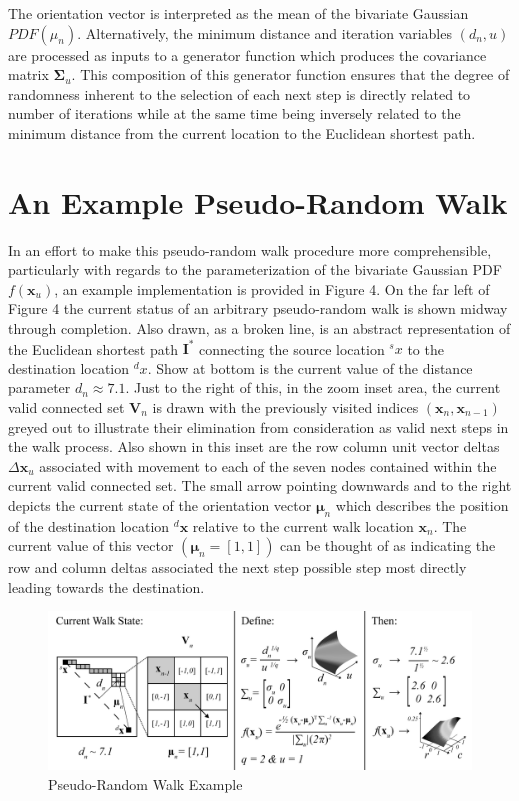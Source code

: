 The orientation vector is interpreted as the mean of the bivariate Gaussian $PDF(\mu_n)$. Alternatively, the minimum distance and iteration variables $(d_n ,u)$ are processed as inputs to a generator function which produces the covariance matrix $\boldsymbol{\Sigma}_u$. This composition of this generator function ensures that the degree of randomness inherent to the selection of each next step is directly related to number of iterations while at the same time being inversely related to the minimum distance from the current location to the Euclidean shortest path.
            
\section{An Example Pseudo-Random Walk}

In an effort to make this pseudo-random walk procedure more comprehensible, particularly with regards to the parameterization of the bivariate Gaussian PDF $f(\textbf{x}_u)$, an example implementation is provided in Figure 4. On the far left of Figure 4 the current status of an arbitrary pseudo-random walk is shown midway through completion. Also drawn, as a broken line, is an abstract representation of the Euclidean shortest path $\textbf{I}^*$ connecting the source location ${}^{s}x$ to the destination location ${}^{d}x$. Show at bottom is the current value of the distance parameter $d_n \approx 7.1$. Just to the right of this, in the zoom inset area, the current valid connected set $\textbf{V}_n$ is drawn with the previously visited indices $(\textbf{x}_n ,\textbf{x}_{n-1})$ greyed out to illustrate their elimination from consideration as valid next steps in the walk process. Also shown in this inset are the row column unit vector deltas $\Delta\textbf{x}_u$ associated with movement to each of the seven nodes contained within the current valid connected set. The small arrow pointing downwards and to the right depicts the current state of the orientation vector $\boldsymbol\mu_n$ which describes the position of the destination location ${}^{d}\textbf{x}$ relative to the current walk location $\textbf{x}_n$. The current value of this vector $(\boldsymbol\mu_n = [1,1])$ can be thought of as indicating the row and column deltas associated the next step possible step most directly leading towards the destination.
            
            \begin{figure}[!h]
            \centering
            \includegraphics[width=5.5in]{figures/pseudo-random-walk-example.png}
            \caption[Pseudo-Random Walk Example]{Pseudo-Random Walk Example}
            \label{fig:pseudo-random-walk-example}
            \end{figure}
            
